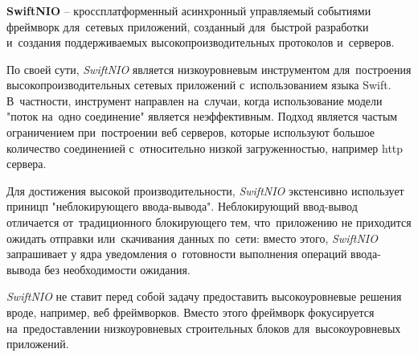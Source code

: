\subsubsection{}
\label{sec:development:arch:pp:nio}

\textbf{SwiftNIO} -- кроссплатформенный асинхронный управляемый событиями фреймворк для~сетевых приложений, созданный для~быстрой разработки и~создания поддерживаемых высокопроизводительных протоколов и~серверов\cite{nio:github}.

По своей сути, \textit{SwiftNIO} является низкоуровневым инструментом для~построения высокопроизводительных сетевых приложений с~использованием языка Swift. В~частности, инструмент направлен на~случаи, когда использование модели "поток на~одно соединение"  является неэффективным. Подход является частым ограничением при~построении веб серверов, которые используют большое количество соединенией с~относительно низкой загруженностью, например \gls{http} сервера.

Для достижения высокой производительности, \textit{SwiftNIO} экстенсивно использует приницп "неблокирующего ввода-вывода". Неблокирующий ввод-вывод отличается от~традиционного блокирующего тем, что~приложению не приходится ожидать отправки или~скачивания данных по~сети: вместо этого, \textit{SwiftNIO} запрашивает у ядра уведомления о~готовности выполнения операций ввода-вывода без необходимости ожидания.

\textit{SwiftNIO} не ставит перед собой задачу предоставить высокоуровневые решения вроде, например, веб фреймворков. Вместо этого фреймворк фокусируется на~предоставлении низкоуровневых строительных блоков для~высокоуровневых приложений.